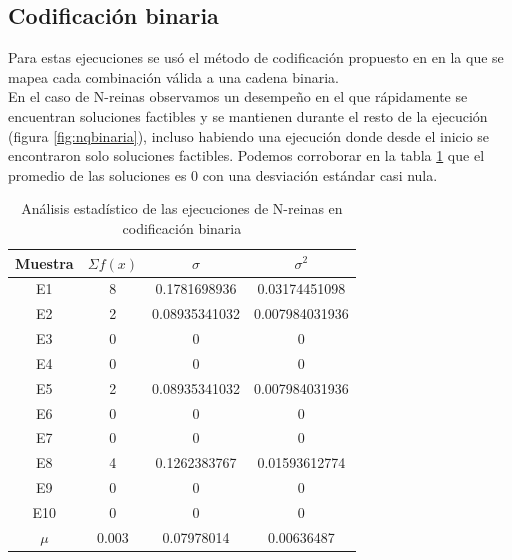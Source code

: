 \documentclass[letterpaper,12pt]{article}
\theoremstyle{definition}
\begin{document}
\subsection{Codificación binaria}

Para estas ejecuciones se usó el método de codificación propuesto en \cite{moh06} en la que se mapea cada combinación válida a una cadena binaria. \\

En el caso de N-reinas observamos un desempeño en el que rápidamente se encuentran soluciones factibles y se mantienen durante el resto de la ejecución (figura \ref{fig:nqbinaria}), incluso habiendo una ejecución donde desde el inicio se encontraron solo soluciones factibles. Podemos corroborar en la tabla \ref{tab:nqbin} que el promedio de las soluciones es 0 con una desviación estándar casi nula.

\begin{table}
  \begin{center}
    \begin{tabular}{cccc}
      \toprule 
        Muestra & \(\Sigma f(x)\) & \(\sigma\)  & \(\sigma^2\)  \\
        \midrule
        \rowcolor{black!20} E1 & 8 & 0.1781698936 & 0.03174451098 \\
        E2 & 2 & 0.08935341032 & 0.007984031936 \\
        \rowcolor{black!20} E3 & 0 & 0 & 0\\
        E4 & 0 & 0 & 0\\
        \rowcolor{black!20} E5 & 2 & 0.08935341032 & 0.007984031936 \\
        E6 & 0 & 0 & 0 \\
        \rowcolor{black!20} E7 & 0 & 0 & 0 \\
        E8 & 4 & 0.1262383767 & 0.01593612774\\
        \rowcolor{black!20} E9 & 0 & 0 & 0 \\
        E10 & 0 & 0 & 0 \\
        \rowcolor{black!20} \(\mu\) & 0.003 & 0.07978014 & 0.00636487 \\ 
        \bottomrule
      \end{tabular}
  \end{center}
  \caption{Análisis estadístico de las ejecuciones de N-reinas en codificación binaria}
  \label{tab:nqbin}  
\end{table}
\end{document}
